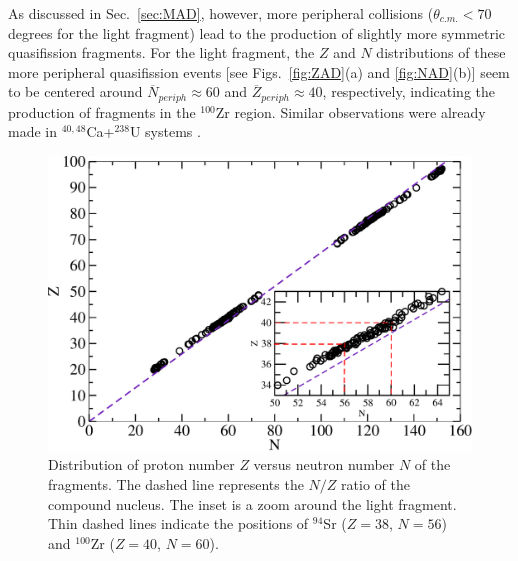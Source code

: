 As discussed in Sec.~\ref{sec:MAD}, however, more peripheral collisions ($\theta_{c.m.}<70$ degrees for the light fragment) lead to the production of slightly more symmetric quasifission fragments.
For the light fragment, the $Z$ and $N$ distributions of these more peripheral quasifission events [see Figs.~\ref{fig:ZAD}(a) and \ref{fig:NAD}(b)] seem to be centered around $\overline{N}_{periph}\approx60$ and $\overline{Z}_{periph}\approx40$, respectively, indicating the production of fragments in the $^{100}$Zr region.
Similar observations were already made in $^{40,48}$Ca+$^{238}$U systems \citep{oberacker2014}.
\begin{figure}
	\centerline{\includegraphics*[width=\textwidth]{../Figures/CaBk/NZ.pdf}}
	\caption{Distribution of proton number $Z$ versus neutron number $N$ of the fragments. The dashed line represents the $N/Z$ ratio of the compound nucleus.
		The inset is a zoom around the light fragment. Thin dashed lines indicate the positions of $^{94}$Sr ($Z=38$, $N=56$) and $^{100}$Zr ($Z=40$, $N=60$).}
	\label{fig:NZ}
\end{figure}
